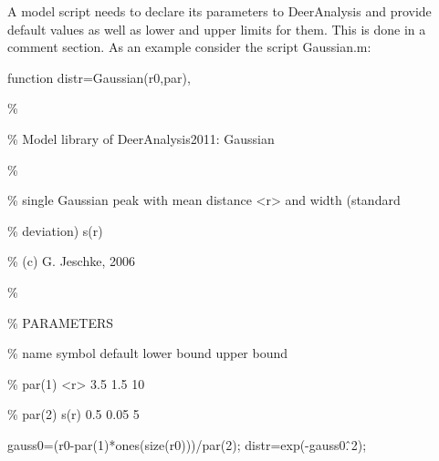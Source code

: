 \documentclass{article}
\begin{document}
A model script needs to declare its parameters to DeerAnalysis and provide default values as well as lower and upper limits for them. This is done in a comment section. As an example consider the script {\ttfamily Gaussian.m}:
\vspace{10pt}

{\ttfamily \small
function distr=Gaussian(r0,par),

\%

\% Model library of DeerAnalysis2011: Gaussian

\%

\% single Gaussian peak with mean distance <r> and width (standard

\% deviation) s(r)

\% (c) G. Jeschke, 2006

\%

\% PARAMETERS

\% name    symbol default lower bound upper bound

\% par(1)  <r>    3.5     1.5         10

\% par(2)  s(r)   0.5     0.05        5

gauss0=(r0-par(1)*ones(size(r0)))/par(2);
distr=exp(-gauss0.\^\,2);   
}

\vspace{10pt}
\end{document}
